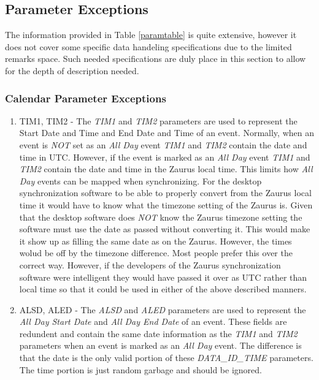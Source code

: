    \subsection{Parameter Exceptions}

    The information provided in Table \ref{paramtable} is quite extensive,
    however it does not cover some specific data handeling specifications due
    to the limited remarks space. Such needed specifications are duly place in
    this section to allow for the depth of description needed.

    \subsubsection{Calendar Parameter Exceptions}

    \begin{enumerate}
      \item TIM1, TIM2 - The \emph{TIM1} and \emph{TIM2} parameters are used
      to represent the Start Date and Time and End Date and Time of an
      event. Normally, when an event is \emph{NOT} set as an \emph{All Day}
      event \emph{TIM1} and \emph{TIM2} contain the date and time in
      UTC. However, if the event is marked as an \emph{All Day} event
      \emph{TIM1} and \emph{TIM2} contain the date and time in the Zaurus
      local time. This limits how \emph{All Day} events can be mapped when
      synchronizing. For the desktop synchronization software to be able to
      properly convert from the Zaurus local time it would have to know what
      the timezone setting of the Zaurus is. Given that the desktop software
      does \emph{NOT} know the Zaurus timezone setting the software must use
      the date as passed without converting it. This would make it show up as
      filling the same date as on the Zaurus. However, the times wolud be off
      by the timezone difference. Most people prefer this over the correct
      way. However, if the developers of the Zaurus synchronization software
      were intelligent they would have passed it over as UTC rather than local
      time so that it could be used in either of the above described manners.

      \item ALSD, ALED - The \emph{ALSD} and \emph{ALED} parameters are used
      to represent the \emph{All Day Start Date} and \emph{All Day End Date}
      of an event. These fields are redundent and contain the same date
      information as the \emph{TIM1} and \emph{TIM2} parameters when an event
      is marked as an \emph{All Day} event. The difference is that the date is
      the only valid portion of these \emph{DATA\_ID\_TIME} parameters. The
      time portion is just random garbage and should be ignored.
    \end{enumerate}

